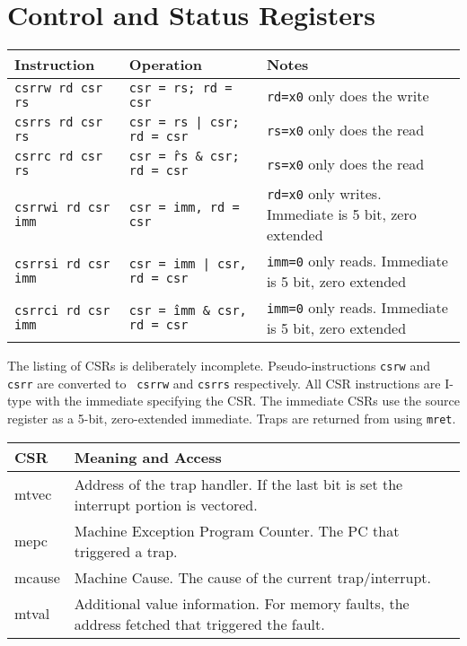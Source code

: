 \section*{Control and Status Registers}
\small
\begin{tabular}{l|l|l}
Instruction & Operation & Notes \\ \hline
{\tt csrrw rd csr rs} & {\tt csr = rs; rd = csr} & {\tt rd=x0} only does the write \\
{\tt csrrs rd csr rs} & {\tt csr = rs | csr; rd = csr} & {\tt rs=x0} only does the read \\
{\tt csrrc rd csr rs} & {\tt csr = \^rs \& csr; rd = csr} & {\tt rs=x0} only does the read \\
{\tt csrrwi rd csr imm} & {\tt csr = imm, rd = csr} & {\tt rd=x0} only writes.  Immediate is 5 bit, zero extended \\
{\tt csrrsi rd csr imm} & {\tt csr = imm | csr, rd = csr} & {\tt imm=0} only reads.  Immediate is 5 bit, zero extended \\
{\tt csrrci rd csr imm} & {\tt csr = \^imm \& csr, rd = csr} & {\tt imm=0} only reads.  Immediate is 5 bit, zero extended \\
\end{tabular}

\vspace{0.5in} The listing of CSRs is deliberately incomplete.
Pseudo-instructions {\tt csrw} and {\tt csrr} are converted to {\tt
  csrrw} and {\tt csrrs} respectively.  All CSR instructions are
I-type with the immediate specifying the CSR.  The immediate CSRs use
the source register as a 5-bit, zero-extended immediate.  Traps are
returned from using {\tt mret}.

\vspace{0.2in}

\begin{tabular}{l|l}
  CSR & Meaning and Access \\ \hline
  mtvec & Address of the trap handler.  If the last bit is set the interrupt portion is vectored. \\
  mepc & Machine Exception Program Counter.  The PC that triggered a trap. \\
  mcause & Machine Cause.  The cause of the current trap/interrupt. \\
  mtval & Additional value information.  For memory faults, the address fetched that triggered the fault.
\end{tabular}

